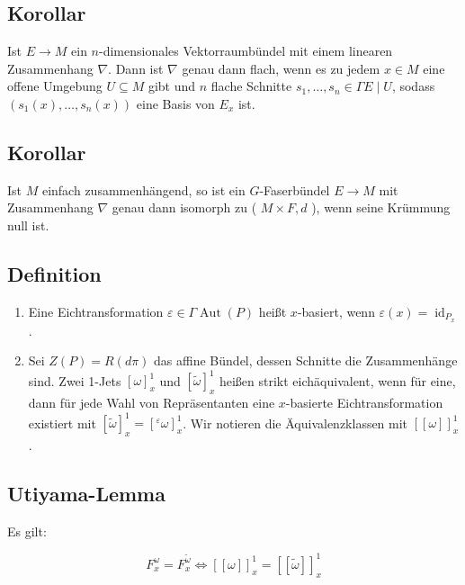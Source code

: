 \documentclass[10pt, letterpaper]{article}
\begin{document}
\subsection*{Korollar}
Ist $E \rightarrow M$ ein $n$-dimensionales Vektorraumbündel mit einem linearen Zusammenhang $\nabla$. Dann ist $\nabla$ genau dann flach, wenn es zu jedem $x \in M$ eine offene Umgebung $U \subseteq M$ gibt und $n$ flache Schnitte $s_{1}, \ldots, s_{n} \in \Gamma E \mid U$, sodass $\left(s_{1}(x), \ldots, s_{n}(x)\right)$ eine Basis von $E_{x}$ ist.

\subsection*{Korollar}
Ist $M$ einfach zusammenhängend, so ist ein $G$-Faserbündel $E \rightarrow M$ mit Zusammenhang $\nabla$ genau dann isomorph zu ( $M \times F, d$ ), wenn seine Krümmung null ist.

\subsection*{Definition}
\begin{enumerate}
  \item Eine Eichtransformation $\varepsilon \in \Gamma \operatorname{Aut}(P)$ heißt $x$-basiert, wenn $\varepsilon(x)=\operatorname{id}_{P_{x}}$.
  \item Sei $Z(P)=R(d \pi)$ das affine Bündel, dessen Schnitte die Zusammenhänge sind. Zwei 1-Jets $[\omega]_{x}^{1}$ und $[\tilde{\omega}]_{x}^{1}$ heißen strikt eichäquivalent, wenn für eine, dann für jede Wahl von Repräsentanten eine $x$-basierte Eichtransformation existiert mit $[\tilde{\omega}]_{x}^{1}=\left[{ }^{\varepsilon} \omega\right]_{x}^{1}$. Wir notieren die Äquivalenzklassen mit $[[\omega]]_{x}^{1}$.
\end{enumerate}

\subsection*{Utiyama-Lemma}
Es gilt:

$$
F_{x}^{\omega}=F_{x}^{\tilde{\omega}} \Leftrightarrow[[\omega]]_{x}^{1}=[[\tilde{\omega}]]_{x}^{1}
$$
\end{document}

